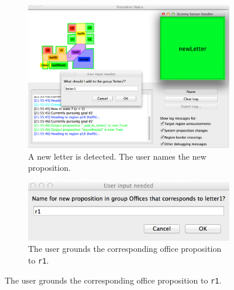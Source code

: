 \begin{figure}[h]
	\centering
	\begin{subfigure}[b]{0.99\columnwidth}
	\includegraphics[width=0.99\columnwidth, clip]{./img/sim1.jpg}
	\caption{A new letter is detected. The user names the new proposition.} 
	\label{Fig:sim1}
	\end{subfigure}
	
	\vspace{4 pt}
	\begin{subfigure}[b]{0.99\columnwidth}
	\includegraphics[width=0.99\columnwidth, clip]{./img/sim2.jpg}
	\caption{The user grounds the corresponding office proposition to \texttt{r1}.} 
	\label{Fig:sim2}
	\end{subfigure}
	

\end{figure}
